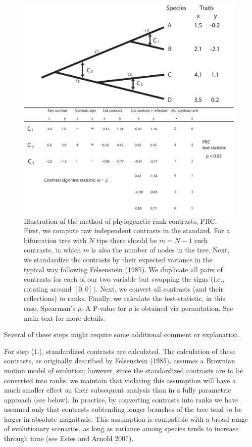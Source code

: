 \documentclass[fleqn,10pt,lineno]{wlpeerj} %
\begin{document}
\begin{figure}
\includegraphics[width=1\linewidth]{Harmon-fig1} \caption{Illustration of the method of phylogenetic rank contrasts, PRC. First, we compute raw independent contrasts in the standard. For a bifurcation tree with $N$ tips there should be $m=N-1$ such contrasts, in which $m$ is also the number of nodes in the tree. Next, we standardize the contrasts by their expected variance in the typical way following Felsenstein (1985). We duplicate all pairs of contrasts for each of our two variable but swapping the signs (i.e., rotating around $[0,0]$). Next, we convert all contrasts (and their reflections) to ranks. Finally, we calculate the test-statistic, in this case, Spearman's $\rho$. A P-value for $\rho$ is obtained via permutation. See main text for more details.}\label{fig:Harmon-fig1}
\end{figure}

Several of these steps might require some additional comment or explanation.

For step (1.), standardized contrasts are calculated. The calculation of these contrasts, as originally described by Felsenstein (1985), assumes a Brownian motion model of evolution; however, since the standardized contrasts are to be converted into ranks, we maintain that violating this assumption will have a much smaller effect on their subsequent analysis than in a fully parametric approach (see below). In practice, by converting contrasts into ranks we have assumed only that contrasts subtending longer branches of the tree tend to be larger in absolute magnitude. This assumption is compatible with a broad range of evolutionary scenarios, as long as variance among species tends to increase through time (see Estes and Arnold 2007).
\end{document}
